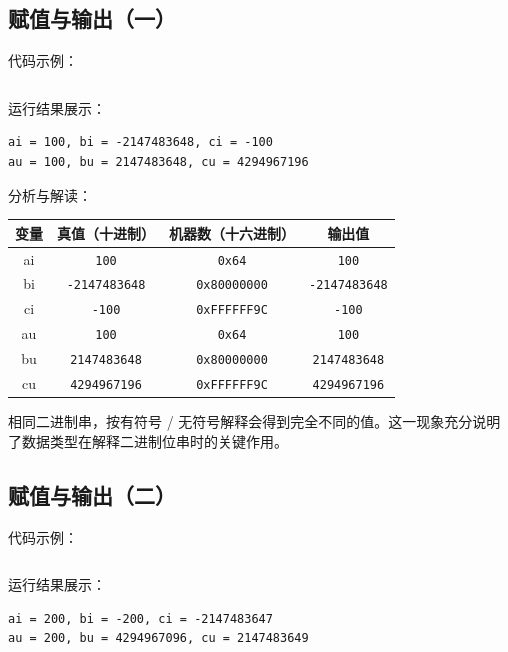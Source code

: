 \documentclass[12pt, a4paper]{academics}
\begin{document}
\subsection{赋值与输出（一）}

代码示例：

\inputminted{c}{../src/assignment_1.c}

运行结果展示：

\begin{verbatim}
ai = 100, bi = -2147483648, ci = -100
au = 100, bu = 2147483648, cu = 4294967196
\end{verbatim}

分析与解读：

\begin{center}
\begin{tabular}{|c|c|c|c|}
\hline
变量 & 真值（十进制） & 机器数（十六进制） & 输出值 \\
\hline
ai & \texttt{100} & \texttt{0x64} & \texttt{100} \\
\hline
bi & \texttt{-2147483648} & \texttt{0x80000000} & \texttt{-2147483648} \\
\hline
ci & \texttt{-100} & \texttt{0xFFFFFF9C} & \texttt{-100} \\
\hline
au & \texttt{100} & \texttt{0x64} & \texttt{100} \\
\hline
bu & \texttt{2147483648} & \texttt{0x80000000} & \texttt{2147483648} \\
\hline
cu & \texttt{4294967196} & \texttt{0xFFFFFF9C} & \texttt{4294967196} \\
\hline
\end{tabular}
\end{center}

相同二进制串，按有符号 / 无符号解释会得到完全不同的值。这一现象充分说明了数据类型在解释二进制位串时的关键作用。

\subsection{赋值与输出（二）}

代码示例：

\inputminted{c}{../src/assignment_2.c}

运行结果展示：

\begin{verbatim}
ai = 200, bi = -200, ci = -2147483647
au = 200, bu = 4294967096, cu = 2147483649
\end{verbatim}
\end{document}
